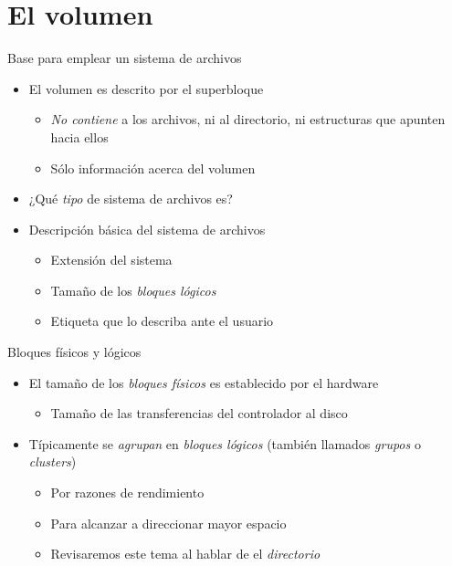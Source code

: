 \documentclass[presentation]{beamer}
\begin{document}
\section{El volumen}
\label{sec:org2bb16e1}
\begin{frame}[label={sec:orgb88c2b3}]{Base para emplear un sistema de archivos}
\begin{itemize}
\item El volumen es descrito por el superbloque
\begin{itemize}
\item \emph{No contiene} a los archivos, ni al directorio, ni estructuras
que apunten hacia ellos
\item Sólo información acerca del volumen
\end{itemize}
\item ¿Qué \emph{tipo} de sistema de archivos es?
\item Descripción básica del sistema de archivos
\begin{itemize}
\item Extensión del sistema
\item Tamaño de los \emph{bloques lógicos}
\item Etiqueta que lo describa ante el usuario
\end{itemize}
\end{itemize}
\end{frame}

\begin{frame}[label={sec:org5a0767e}]{Bloques físicos y lógicos}
\begin{itemize}
\item El tamaño de los \emph{bloques físicos} es establecido por el hardware
\begin{itemize}
\item Tamaño de las transferencias del controlador al disco
\end{itemize}
\item Típicamente se \emph{agrupan} en \emph{bloques lógicos} (también llamados
\emph{grupos} o \emph{clusters})
\begin{itemize}
\item Por razones de rendimiento
\item Para alcanzar a direccionar mayor espacio
\item Revisaremos este tema al hablar de el \emph{directorio}
\end{itemize}
\end{itemize}
\end{frame}
\end{document}
